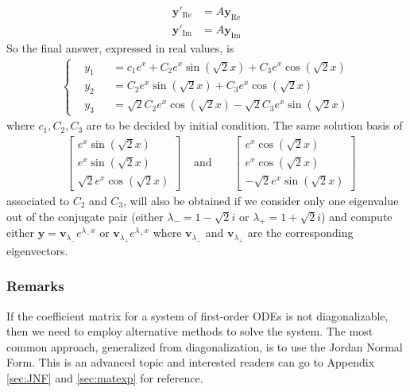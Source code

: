 \begin{solution}
\begin{align*}
\textbf{y}'_{\text{Re}} &= A\textbf{y}_{\text{Re}} \\
\textbf{y}'_{\text{Im}} &= A\textbf{y}_{\text{Im}}
\end{align*}
So the final answer, expressed in real values, is
\begin{align*}
\left\{\begin{alignedat}{2}
&y_1 & &= c_1e^x + C_2e^{x}\sin(\sqrt{2}x) + C_3e^{x}\cos(\sqrt{2}x) \\
&y_2 & &= C_2e^{x}\sin(\sqrt{2}x) + C_3e^{x}\cos(\sqrt{2}x) \\
&y_3 & &= \sqrt{2}C_2e^{x}\cos(\sqrt{2}x) - \sqrt{2}C_3e^{x}\sin(\sqrt{2}x)
\end{alignedat}\right.
\end{align*}
where $c_1, C_2, C_3$ are to be decided by initial condition. The same solution basis of 
\begin{align*}
&\begin{bmatrix}
e^{x}\sin(\sqrt{2}x) \\
e^{x}\sin(\sqrt{2}x) \\
\sqrt{2}e^{x}\cos(\sqrt{2}x)
\end{bmatrix}
& \text{ and } &
&\begin{bmatrix}
e^{x}\cos(\sqrt{2}x) \\
e^{x}\cos(\sqrt{2}x) \\
-\sqrt{2}e^{x}\sin(\sqrt{2}x)
\end{bmatrix}
\end{align*}
associated to $C_2$ and $C_3$, will also be obtained if we consider only one eigenvalue out of the conjugate pair (either $\lambda_{-} = 1-\sqrt{2}i$ or $\lambda_{+} = 1+\sqrt{2}i$) and compute either $\textbf{y} = \textbf{v}_{\lambda_{-}}e^{\lambda_{-} x}$ or $\textbf{v}_{\lambda_{+}}e^{\lambda_{+} x}$ where $\textbf{v}_{\lambda_{-}}$ and $\textbf{v}_{\lambda_{+}}$ are the corresponding eigenvectors. 
\end{solution}

\subsubsection{Remarks} If the coefficient matrix for a system of first-order ODEs is not diagonalizable, then we need to employ alternative methods to solve the system. The most common approach, generalized from diagonalization, is to use the Jordan Normal Form. This is an advanced topic and interested readers can go to Appendix \ref{sec:JNF} and \ref{sec:matexp} for reference.

